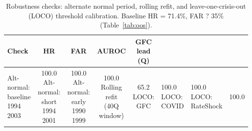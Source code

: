 \begin{table}[htbp]
\centering
\caption{Robustness checks: alternate normal period, rolling refit, and leave-one-crisis-out (LOCO) threshold calibration. Baseline HR = 71.4\%, FAR ? 35\% (Table~\ref{tab:oos}).}
\label{tab:robustness}
\begin{tabular}{lcccc}
\toprule
Check & HR & FAR & AUROC & GFC lead (Q) \\
\midrule
Alt-normal: baseline 1994 2003 & 100.0%
Alt-normal: short 1994 2001 & 100.0%
Alt-normal: early 1990 1999 & 100.0%
Rolling refit (40Q window) & 65.2%
LOCO: GFC & 100.0%
LOCO: COVID & 100.0%
LOCO: RateShock & 100.0%
\bottomrule
\end{tabular}
\end{table}
